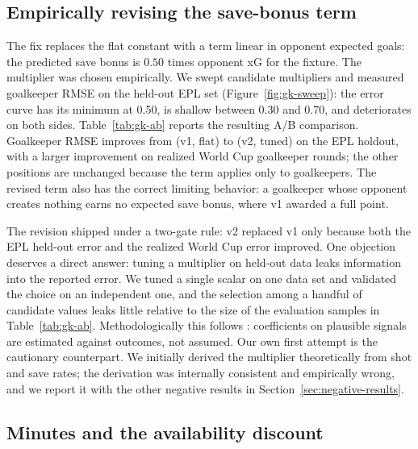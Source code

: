 \subsection{Empirically revising the save-bonus term}
\label{sec:analysis-gk-formula}

The fix replaces the flat constant with a term linear in opponent
expected goals: the predicted save bonus is $0.50$ times opponent xG
for the fixture. The multiplier was chosen empirically. We swept
candidate multipliers and measured goalkeeper RMSE on the held-out EPL
set (Figure~\ref{fig:gk-sweep}): the error curve has its minimum at
0.50, is shallow between 0.30 and 0.70, and deteriorates on both sides.
Table~\ref{tab:gk-ab} reports the resulting A/B comparison. Goalkeeper
RMSE improves from \GkRmseVOne{} (v1, flat) to \GkRmseVTwo{} (v2,
tuned) on the EPL holdout, with a larger improvement on realized World
Cup goalkeeper rounds; the other positions are unchanged because the
term applies only to goalkeepers. The revised term also has the correct
limiting behavior: a goalkeeper whose opponent creates nothing earns no
expected save bonus, where v1 awarded a full point.

The revision shipped under a two-gate rule: v2 replaced v1 only because
both the EPL held-out error and the realized World Cup error improved.
One objection deserves a direct answer: tuning a multiplier on held-out
data leaks information into the reported error. We tuned a single
scalar on one data set and validated the choice on an independent one,
and the selection among a handful of candidate values leaks little
relative to the size of the evaluation samples in
Table~\ref{tab:gk-ab}. Methodologically this follows
\citet{benter1994computer}: coefficients on plausible signals are
estimated against outcomes, not assumed. Our own first attempt is the
cautionary counterpart. We initially derived the multiplier
theoretically from shot and save rates; the derivation was internally
consistent and empirically wrong, and we report it with the other
negative results in Section~\ref{sec:negative-results}.

\subsection{Minutes and the availability discount}
\label{sec:analysis-minutes}

